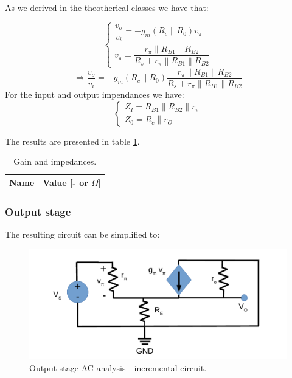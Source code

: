 \clearpage

As we derived in the theotherical classes we have that:

\begin{equation}
    \begin{cases}
        \dfrac{v_{o}}{v_{i}}=-g_{m}\left( R_{c}\| R_{0}\right) v_{\pi } \\
        v_{\pi }=\dfrac{r_{\pi }\left\| R_{B1}\right\| R_{B2}}{R_{s}+r_{\pi }\left\| R_{B1}\right\| R_{B2}}
    \end{cases}
\end{equation}
\begin{equation}
    \Rightarrow \dfrac{v_{o}}{v_{i}}=-g_{m}\left( R_{c}\| R_{0}\right) \dfrac{r_{\pi }\left\| R_{B1}\right\| R_{B2}}{R_{s}+r_{\pi }\left\| R_{B1}\right\| R_{B2}}
\end{equation}
For the input and output impendances we have:
\begin{equation}
    \begin{cases}
        Z_{I}=R_{B1}\left\| R_{B2}\right\| r_{\pi } \\
        Z_{0}= R_{c}\| r_{O}
    \end{cases}
\end{equation}

The results are presented in table \ref{tab:stage1_tab}.
\begin{table}[h]
    \centering
    \begin{tabular}{|l|r|}
      \hline
      {\bf Name} & {\bf Value [- or $\Omega$]} \\ \hline
      
    \end{tabular}
    \caption{Gain and impedances.}
    \label{tab:stage1_tab}
  \end{table}

\subsubsection{Output stage}
The resulting circuit can be simplified to:

\begin{figure}[H]
    \begin{center}
     \includegraphics[width=15cm]{lab4_AC2.pdf}
    \caption{Output stage AC analysis - incremental circuit.}
    \label{fig:AC2 analysis}
    \end{center}
  \end{figure}


